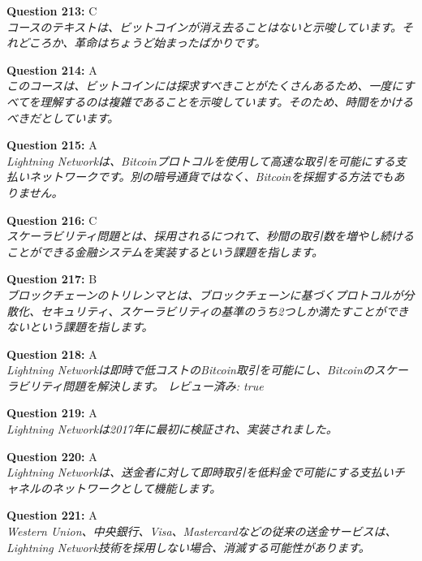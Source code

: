 \documentclass[12pt,a4paper]{article}
\begin{document}
\begin{enumerate}
{{{{{{{{{\item \textbf{Question 213:} C
\\ \textit{コースのテキストは、ビットコインが消え去ることはないと示唆しています。それどころか、革命はちょうど始まったばかりです。}

\item \textbf{Question 214:} A
\\ \textit{このコースは、ビットコインには探求すべきことがたくさんあるため、一度にすべてを理解するのは複雑であることを示唆しています。そのため、時間をかけるべきだとしています。}

\item \textbf{Question 215:} A
\\ \textit{Lightning Networkは、Bitcoinプロトコルを使用して高速な取引を可能にする支払いネットワークです。別の暗号通貨ではなく、Bitcoinを採掘する方法でもありません。}

\item \textbf{Question 216:} C
\\ \textit{スケーラビリティ問題とは、採用されるにつれて、秒間の取引数を増やし続けることができる金融システムを実装するという課題を指します。}

\item \textbf{Question 217:} B
\\ \textit{ブロックチェーンのトリレンマとは、ブロックチェーンに基づくプロトコルが分散化、セキュリティ、スケーラビリティの基準のうち2つしか満たすことができないという課題を指します。}

\item \textbf{Question 218:} A
\\ \textit{Lightning Networkは即時で低コストのBitcoin取引を可能にし、Bitcoinのスケーラビリティ問題を解決します。 レビュー済み: true}

\item \textbf{Question 219:} A
\\ \textit{Lightning Networkは2017年に最初に検証され、実装されました。}

\item \textbf{Question 220:} A
\\ \textit{Lightning Networkは、送金者に対して即時取引を低料金で可能にする支払いチャネルのネットワークとして機能します。}

\item \textbf{Question 221:} A
\\ \textit{Western Union、中央銀行、Visa、Mastercardなどの従来の送金サービスは、Lightning Network技術を採用しない場合、消滅する可能性があります。}

}}}}}}}}}
\end{enumerate}
\end{document}

